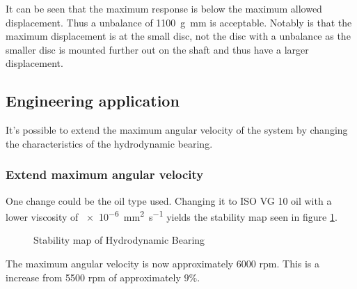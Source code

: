 It can be seen that the maximum response is below the maximum allowed displacement. Thus a unbalance of \SI{1100}{\gram \milli \meter} is acceptable. Notably is that the maximum displacement is at the small disc, not the disc with a unbalance as the smaller disc is mounted further out on the shaft and thus have a larger displacement.

\subsection{Engineering application}
It's possible to extend the maximum angular velocity of the system by changing the characteristics of the hydrodynamic bearing.

\subsubsection{Extend maximum angular velocity}
One change could be the oil type used. Changing it to ISO VG 10 oil with a lower viscosity of \SI{e-6}{\square \milli \meter \per \second} yields the stability map seen in figure \ref{fig:hydrodynamic_bearing_stability_map}.
\begin{figure}[ht]
    \centering
    
    \caption{Stability map of Hydrodynamic Bearing}
    \label{fig:hydrodynamic_bearing_stability_map}
\end{figure}
The maximum angular velocity is now approximately 6000 rpm. This is a increase from 5500 rpm of approximately $9 \%$.